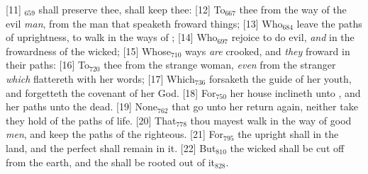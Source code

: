 [11] \textcolor[cmyk]{0.99998,1,0,0}{\textcolor{jungle}{$_{659}$} shall preserve thee,  shall keep thee:}
[12] \textcolor[cmyk]{0.99998,1,0,0}{To\textcolor{jungle}{$_{667}$}  thee from the way of the evil \emph{man}, from the man that speaketh froward things;}
[13] \textcolor[cmyk]{0.99998,1,0,0}{Who\textcolor{jungle}{$_{684}$} leave the paths of uprightness, to walk in the ways of ;}
[14] \textcolor[cmyk]{0.99998,1,0,0}{Who\textcolor{jungle}{$_{697}$} rejoice to do evil, \emph{and}  in the frowardness of the wicked;} %
[15] \textcolor[cmyk]{0.99998,1,0,0}{Whose\textcolor{jungle}{$_{710}$} ways \emph{are} crooked, and \emph{they} froward in their paths:}
[16] \textcolor[cmyk]{0.99998,1,0,0}{To\textcolor{jungle}{$_{720}$}  thee from the strange woman, \emph{even} from the stranger \emph{which} flattereth with her words;}
[17] \textcolor[cmyk]{0.99998,1,0,0}{Which\textcolor{jungle}{$_{736}$} forsaketh the guide of her youth, and forgetteth the covenant of her God.}
[18] \textcolor[cmyk]{0.99998,1,0,0}{For\textcolor{jungle}{$_{750}$} her house inclineth unto , and her paths unto the dead.}
[19] \textcolor[cmyk]{0.99998,1,0,0}{None\textcolor{jungle}{$_{762}$} that go unto her return again, neither take they hold of the paths of life.}
[20] \textcolor[cmyk]{0.99998,1,0,0}{That\textcolor{jungle}{$_{778}$} thou mayest walk in the way of good \emph{men}, and keep the paths of the righteous.}
[21] \textcolor[cmyk]{0.99998,1,0,0}{For\textcolor{jungle}{$_{795}$} the upright shall  in the land, and the perfect shall remain in it.}
[22] \textcolor[cmyk]{0.99998,1,0,0}{But\textcolor{jungle}{$_{810}$} the wicked shall be cut off from the earth, and the  shall be rooted out of it\textcolor{jungle}{$_{828}$}.}



